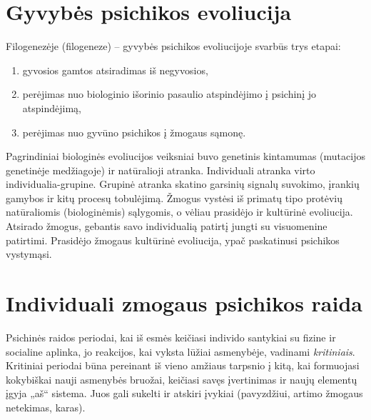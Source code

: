 \section{Gyvybės psichikos evoliucija}

\label{tema:gyvybes_psichikos_evoliucija}

Filogenezėje (\gls{filogeneze}) – gyvybės psichikos evoliucijoje svarbūs 
trys etapai: 
\begin{enumerate}
  \item gyvosios gamtos atsiradimas iš negyvosios,
  \item perėjimas nuo biologinio išorinio pasaulio atspindėjimo į psichinį 
    jo atspindėjimą,
  \item perėjimas nuo gyvūno psichikos į žmogaus sąmonę.
\end{enumerate}

Pagrindiniai biologinės evoliucijos veiksniai buvo genetinis kintamumas
(mutacijos genetinėje medžiagoje) ir natūralioji atranka. Individuali 
atranka virto individualia-grupine. Grupinė atranka skatino garsinių signalų
suvokimo, įrankių gamybos ir kitų procesų tobulėjimą. Žmogus vystėsi iš 
primatų tipo protėvių natūraliomis (biologinėmis) sąlygomis, o vėliau 
prasidėjo ir kultūrinė evoliucija. Atsirado žmogus, gebantis savo 
individualią patirtį jungti su visuomenine patirtimi. Prasidėjo žmogaus
kultūrinė evoliucija, ypač paskatinusi psichikos vystymąsi.

\section{Individuali zmogaus psichikos raida}

\label{tema:psichikos_raida}

Psichinės raidos periodai, kai iš esmės keičiasi individo santykiai
su fizine ir socialine aplinka, jo reakcijos, kai vyksta lūžiai asmenybėje,
vadinami \emph{kritiniais}. Kritiniai periodai būna pereinant iš vieno 
amžiaus tarpsnio į kitą, kai formuojasi kokybiškai nauji asmenybės 
bruožai, keičiasi savęs įvertinimas ir naujų elementų įgyja „aš“ sistema.
Juos gali sukelti ir atskiri įvykiai (pavyzdžiui, artimo žmogaus netekimas, 
karas).

